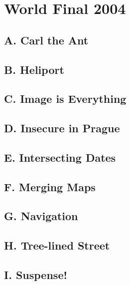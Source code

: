 \section{World Final 2004}
\subsection{A. Carl the Ant}
\raggedbottom
\hrulefill
\subsection{B. Heliport}
\raggedbottom
\hrulefill
\subsection{C. Image is Everything}
\raggedbottom
\hrulefill
\subsection{D. Insecure in Prague}
\raggedbottom
\hrulefill
\subsection{E. Intersecting Dates}
\raggedbottom
\hrulefill
\subsection{F. Merging Maps}
\raggedbottom
\hrulefill
\subsection{G. Navigation}
\raggedbottom
\hrulefill
\subsection{H. Tree-lined Street}
\raggedbottom
\hrulefill
\subsection{I. Suspense!}
\raggedbottom
\hrulefill
